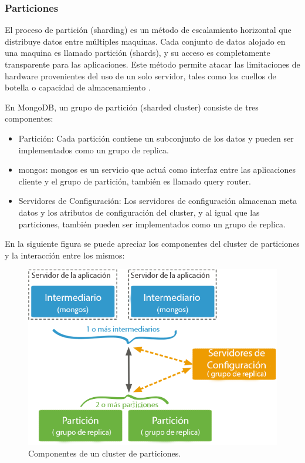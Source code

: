 \subsubsection{Particiones}

El proceso de partición (sharding) es un método de escalamiento horizontal que distribuye datos entre múltiples maquinas.
Cada conjunto de datos alojado en una maquina es llamado partición (shards), y su acceso es completamente transparente
para las aplicaciones. Este método permite atacar las limitaciones de hardware provenientes del uso de un solo servidor, tales como
los cuellos de botella o capacidad de almacenamiento \cite{13}.

En MongoDB, un grupo de partición (sharded cluster) consiste de tres componentes:

\begin{itemize}
\item Partición: Cada partición contiene un subconjunto de los datos y pueden ser implementados como un grupo de replica.

\item mongos: mongos es un servicio que actuá como interfaz entre las aplicaciones cliente y el grupo de partición, también es llamado
query router.

\item Servidores de Configuración: Los servidores de configuración almacenan meta datos y los atributos de configuración del cluster, y
al igual que las particiones, también pueden ser implementados como un grupo de replica.
\end{itemize}

En la siguiente figura se puede apreciar los componentes del cluster de particiones y la interacción entre los mismos:

\begin{figure}[H]
	\centering
		\includegraphics[width=.7\textwidth]{figures/sharding}
	\caption{Componentes de un cluster de particiones.}
	\label{fig:sharding}
\end{figure}

